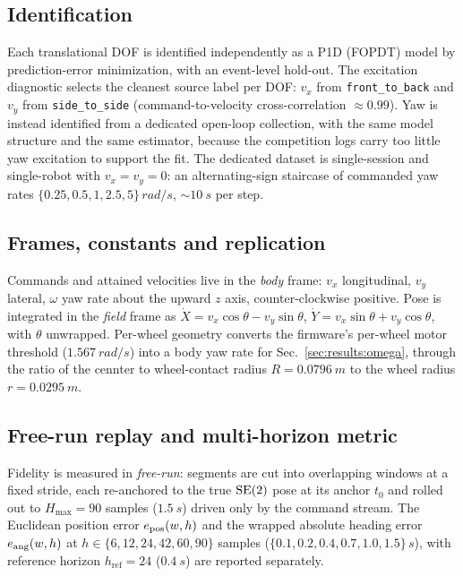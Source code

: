 \subsection{Identification}
\label{sec:method:id}
Each translational DOF is identified independently as a P1D (FOPDT) model by prediction-error minimization, with an event-level hold-out. The excitation diagnostic selects the cleanest source label per DOF: $v_x$ from \texttt{front\_to\_back} and $v_y$ from \texttt{side\_to\_side} (command-to-velocity cross-correlation $\approx 0.99$).
Yaw is instead identified from a dedicated open-loop collection, with the same model structure and the same estimator, because the competition logs carry too little yaw excitation to support the fit. The dedicated dataset is single-session and single-robot with $v_x=v_y=0$: an alternating-sign staircase of commanded yaw rates $\{0.25,0.5,1,2.5,5\}\,\si{rad/s}$, $\sim\SI{10}{s}$ per step.

\subsection{Frames, constants and replication}
\label{sec:method:geometry}
Commands and attained velocities live in the \emph{body} frame: $v_x$ longitudinal, $v_y$ lateral, $\omega$ yaw rate about the upward $z$ axis, counter-clockwise positive. Pose is integrated in the \emph{field} frame as $\dot{X} = v_x\cos\theta - v_y\sin\theta$, $\dot{Y} = v_x\sin\theta + v_y\cos\theta$, with $\theta$ unwrapped.
Per-wheel geometry converts the firmware's per-wheel motor threshold ($\SI{1.567}{rad/s}$) into a body yaw rate for Sec.~\ref{sec:results:omega}, through the ratio of the cennter to wheel-contact radius $R=\SI{0.0796}{m}$ to the wheel radius $r=\SI{0.0295}{m}$.

\subsection{Free-run replay and multi-horizon metric}
\label{sec:method:metric}
Fidelity is measured in \emph{free-run}: segments are cut into overlapping windows at a fixed stride, each re-anchored to the true $\mathrm{SE}(2)$ pose at its anchor $t_0$ and rolled out to $H_{\max}=90$ samples ($\SI{1.5}{s}$) driven only by the command stream. The Euclidean position error $e_{\mathrm{pos}}(w,h)$ and the wrapped absolute heading error $e_{\mathrm{ang}}(w,h)$ at $h\in\{6,12,24,42,60,90\}$ samples ($\{0.1,0.2,0.4,0.7,1.0,1.5\}\,\si{s}$), with reference horizon $h_{\mathrm{ref}}=24$ ($\SI{0.4}{s}$) are reported separately. %

